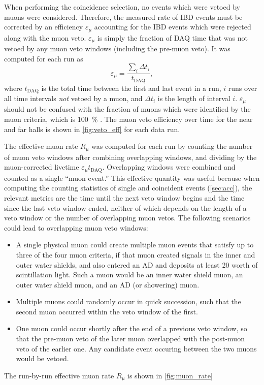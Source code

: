 When performing the coincidence selection, no events which were vetoed by muons
were considered.
Therefore, the measured rate of IBD events
must be corrected by an efficiency $\varepsilon_\mu$
accounting for the IBD events which were rejected along with the muon veto.
$\varepsilon_\mu$ is simply the fraction of DAQ time
that was not vetoed by any muon veto windows (including the pre-muon veto).
It was computed for each run as
\begin{equation}\label{eq:muon_eff}
    \varepsilon_\mu = \frac{\sum_i \Delta t_i}{t_{\text{DAQ}}},
\end{equation}
where $t_{\text{DAQ}}$ is the total time
between the first and last event in a run,
$i$ runs over all time intervals \textit{not} vetoed by a muon,
and $\Delta t_i$ is the length of interval $i$.
$\varepsilon_\mu$ should not be confused
with the fraction of muons which were identified by the muon criteria,
which is \SI{100}{\percent} \cite{muonsystem2015}.
The muon veto efficiency over time for the near and far halls
is shown in \cref{fig:veto_eff} for each data run.

The effective muon rate $R_\mu$ was computed for each run
by counting the number of muon veto windows
after combining overlapping windows, and dividing by the muon-corrected
livetime $\varepsilon_\mu t_{\text{DAQ}}$.
Overlapping windows were combined and counted as a single ``muon event.''
This effective quantity was useful
because when computing the counting statistics of single and coincident events
(\cref{sec:acc}),
the relevant metrics are the time until the next veto window begins
and the time since the last veto window ended,
neither of which depends on the length of a veto window
or the number of overlapping muon vetos.
The following scenarios could lead to overlapping muon veto windows:
\begin{itemize}
    \item A single physical muon could create multiple muon events
        that satisfy up to three of the four muon criteria,
        if that muon created signals in the inner and outer water shields,
        and also entered an AD and deposits at least \SI{20}{\mev} worth of scintillation light.
        Such a muon would be an inner water shield muon,
        an outer water shield muon, and an AD
        (or showering) muon.
    \item Multiple muons could randomly occur in quick succession,
        such that the second muon occurred within the veto window of the first.
    \item One muon could occur shortly after the end of a previous veto window,
        so that the pre-muon veto of the later muon overlapped with the
        post-muon veto of the earlier one.
        Any candidate event occuring between the two muons would be vetoed.
\end{itemize}
The run-by-run effective muon rate $R_\mu$ is shown in \cref{fig:muon_rate}


